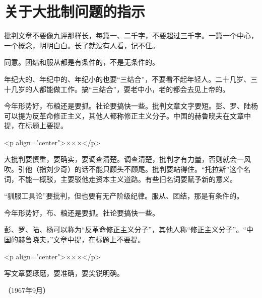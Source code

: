 \section[关于大批制问题的指示（一九六七年五月二日）]{关于大批制问题的指示}


批判文章不要像九评那样长，每篇一、二千字，不要超过三千字。一篇一个中心，一个概念，明明白白。长了就没有人看，记不住。

同意。团结和服从都是有条件的，不是无条件的。

年纪大的、年纪中的、年纪小的也要“三结合”，不要看不起年轻人。二十几岁、三十几岁的人都能做工作。搞“三结合”，要老中小，老的都会去见上帝的。

今年形势好，布粮还是要抓。社论要搞快一些。批判文章文字要短。彭、罗、陆杨可以提为反革命修正主义，其他人都称修正主义分子。中国的赫鲁晓夫在文章中提，在标题上要提。

<p align="center">×××</p>

大批判要慎重，要确实，要调查清楚。调查清楚，批判才有力量，否则就会一风吹。引他（指刘少奇）的话不能只顾头不顾尾。批判要站得住。“托拉斯”这个名词，不能一概驳，主要驳他走资本主义道路。有些旧名词要赋予新的意义。

“驯服工具论”要批判，但也要有无产阶级纪律。服从、团结，那是有条件的。

今年形势好，布、粮还是要抓。社论要搞快一些。

彭、罗、陆、杨可以称为“反革命修正主义分子”，其他人称“修正主义分子”。“中国的赫鲁晓夫，”文章中提，在标题上不要提。

<p align="center">×××</p>

写文章要琢磨，要准确，要尖锐明确。

{\raggedleft （1967年9月）\par}


